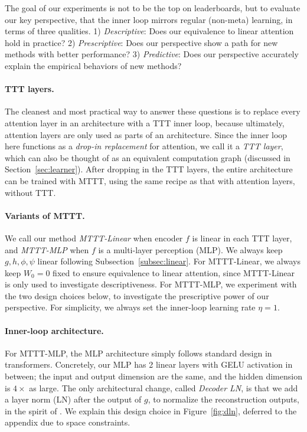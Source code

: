 \documentclass{article}
\begin{document}
The goal of our experiments is not to be the top on leaderboards, but to evaluate our key perspective, that the inner loop mirrors regular (non-meta) learning, in terms of three qualities.
1) \emph{Descriptive}: Does our equivalence to linear attention hold in practice?
2) \emph{Prescriptive}: Does our perspective show a path for new methods with better performance?
3) \emph{Predictive}: Does our perspective accurately explain the empirical behaviors of new methods?

\paragraph{TTT layers.}
The cleanest and most practical way to answer these questions is to replace every attention layer in an architecture with a TTT inner loop, because ultimately, attention layers are only used as parts of an architecture.
Since the inner loop here functions as a \emph{drop-in replacement} for attention, we call it a \emph{TTT layer}, which can also be thought of as an equivalent computation graph (discussed in Section~\ref{sec:learner}).
After dropping in the TTT layers, the entire architecture can be trained with MTTT, using the same recipe as that with attention layers, without TTT.

\paragraph{Variants of MTTT.}
We call our method \emph{MTTT-Linear} when encoder $f$ is linear in each TTT layer, and \emph{MTTT-MLP} when $f$ is a multi-layer perception (MLP). 
We always keep $g, h, \phi, \psi$ linear following Subsection~\ref{subsec:linear}.
For MTTT-Linear, we always keep $W_0=0$ fixed to ensure equivalence to linear attention, since MTTT-Linear is only used to investigate descriptiveness.
For MTTT-MLP, we experiment with the two design choices below, to investigate the prescriptive power of our perspective.
For simplicity, we always set the inner-loop learning rate $\eta=1$. 

\paragraph{Inner-loop architecture.} 
For MTTT-MLP, the MLP architecture simply follows standard design in transformers. 
Concretely, our MLP has 2 linear layers with GELU activation in between; the input and output dimension are the same, and the hidden dimension is $4\times$ as large.
The only architectural change, called \emph{Decoder LN}, is that we add a layer norm (LN) after the output of $g$, to normalize the reconstruction outputs, in the spirit of \cite{mae}.
We explain this design choice in Figure~\ref{fig:dln}, deferred to the appendix due to space constraints.
\end{document}
